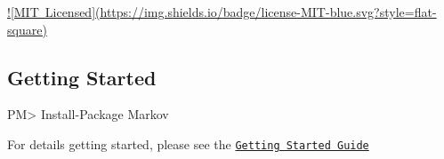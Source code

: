 \mbox{\hyperlink{license_8md}{!\mbox{[}M\+IT Licensed\mbox{]}(https\+://img.shields.io/badge/license-\/\+M\+I\+T-\/blue.svg?style=flat-\/square)}} \href{http://nuget.org/packages/Markov}{\tt }

\href{https://ci.appveyor.com/project/otac0n/Markov}{\tt } \href{https://codecov.io/gh/otac0n/Markov}{\tt } \href{http://nuget.org/packages/Markov}{\tt }

\subsection*{Getting Started }

\begin{DoxyVerb}PM> Install-Package Markov
\end{DoxyVerb}


For details getting started, please see the \href{https://github.com/otac0n/markov/wiki/Getting-Started}{\tt Getting Started Guide} 